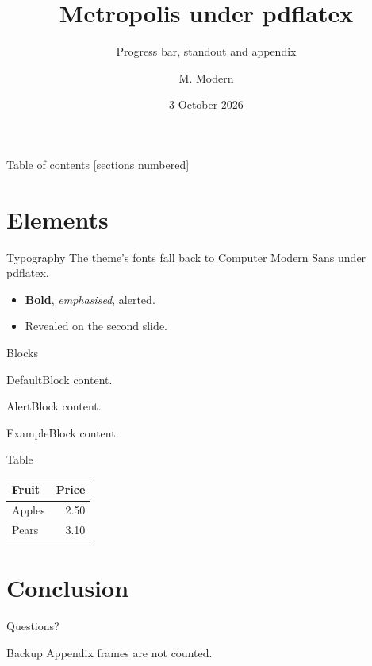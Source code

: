 \documentclass[10pt]{beamer}
\title{Metropolis under pdflatex}
\subtitle{Progress bar, standout and appendix}
\author{M. Modern}
\institute{FlashTeX}
\date{3 October 2026}
\begin{document}
\maketitle
\begin{frame}{Table of contents}
  [sections numbered]
  \tableofcontents[hideallsubsections]
\end{frame}
\section{Elements}
\begin{frame}{Typography}
  The theme's fonts fall back to Computer Modern Sans under pdflatex.
  \begin{itemize}
    \item \textbf{Bold}, \emph{emphasised}, \alert{alerted}.
    \item<2-> Revealed on the second slide.
  \end{itemize}
\end{frame}
\begin{frame}{Blocks}
  \begin{block}{Default}Block content.\end{block}
  \begin{alertblock}{Alert}Block content.\end{alertblock}
  \begin{exampleblock}{Example}Block content.\end{exampleblock}
\end{frame}
\begin{frame}{Table}
  \begin{tabular}{@{} lr @{}}
    \toprule
    Fruit & Price \\
    \midrule
    Apples & 2.50 \\
    Pears & 3.10 \\
    \bottomrule
  \end{tabular}
\end{frame}
\section{Conclusion}
\begin{frame}[standout]
  Questions?
\end{frame}
\appendix
\begin{frame}{Backup}
  Appendix frames are not counted.
\end{frame}
\end{document}

